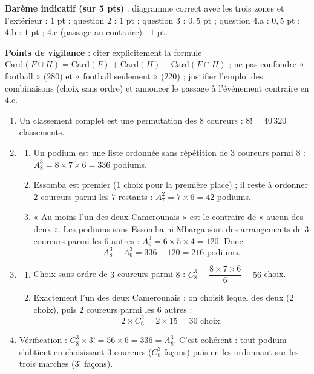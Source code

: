 \documentclass[11pt]{article}
\begin{document}
\begin{corrige}
\begin{enumerate}
\begin{enumerate}
\end{enumerate}
\end{enumerate}
\textbf{Barème indicatif (sur 5 pts)} : diagramme correct avec les trois zones et l'extérieur : $1$ pt ; question 2 : $1$ pt ; question 3 : $0,5$ pt ; question 4.a : $0,5$ pt ; 4.b : $1$ pt ; 4.c (passage au contraire) : $1$ pt.\par
\textbf{Points de vigilance} : citer explicitement la formule $\mathrm{Card}(F \cup H) = \mathrm{Card}(F) + \mathrm{Card}(H) - \mathrm{Card}(F \cap H)$ ; ne pas confondre « football » ($280$) et « football seulement » ($220$) ; justifier l'emploi des combinaisons (choix sans ordre) et annoncer le passage à l'événement contraire en 4.c.
\end{corrige}

\begin{corrige}
\begin{enumerate}
\item Un classement complet est une permutation des $8$ coureurs : $8! = 40\,320$ classements.
\item 
\begin{enumerate}
\item Un podium est une liste ordonnée sans répétition de $3$ coureurs parmi $8$ : $A_8^3 = 8 \times 7 \times 6 = 336$ podiums.
\item Essomba est premier ($1$ choix pour la première place) ; il reste à ordonner $2$ coureurs parmi les $7$ restants : $A_7^2 = 7 \times 6 = 42$ podiums.
\item « Au moins l'un des deux Camerounais » est le contraire de « aucun des deux ». Les podiums sans Essomba ni Mbarga sont des arrangements de $3$ coureurs parmi les $6$ autres : $A_6^3 = 6 \times 5 \times 4 = 120$. Donc :
\[ A_8^3 - A_6^3 = 336 - 120 = 216 \text{ podiums}. \]
\end{enumerate}
\item 
\begin{enumerate}
\item Choix sans ordre de $3$ coureurs parmi $8$ : $C_8^3 = \dfrac{8 \times 7 \times 6}{6} = 56$ choix.
\item Exactement l'un des deux Camerounais : on choisit lequel des deux ($2$ choix), puis $2$ coureurs parmi les $6$ autres :
\[ 2 \times C_6^2 = 2 \times 15 = 30 \text{ choix}. \]
\end{enumerate}
\item Vérification : $C_8^3 \times 3! = 56 \times 6 = 336 = A_8^3$. C'est cohérent : tout podium s'obtient en choisissant $3$ coureurs ($C_8^3$ façons) puis en les ordonnant sur les trois marches ($3!$ façons).

\end{enumerate}
\end{corrige}
\end{document}
